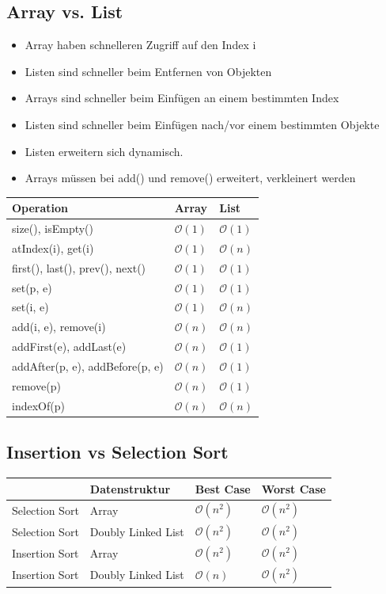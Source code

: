 \subsection{Array vs. List}
\begin{itemize}
	\item Array haben schnelleren Zugriff auf den Index i
	\item Listen sind schneller beim Entfernen von Objekten
	\item Arrays sind schneller beim Einfügen an einem bestimmten Index
	\item Listen sind schneller beim Einfügen nach/vor einem bestimmten Objekte
	\item Listen erweitern sich dynamisch. 
	\item Arrays müssen bei add() und remove() erweitert, verkleinert werden
\end{itemize}
\begin{tabu} to \linewidth {|X|X|X|}
	\hline
	Operation & Array & List \\
	\hline \hline
	size(), isEmpty() 	& $\mathcal{O}(1)$ & $\mathcal{O}(1)$ \\ 
	\hline
	atIndex(i), get(i) 	& $\mathcal{O}(1)$ & $\mathcal{O}(n)$ \\
	\hline
	first(), last(), prev(), next() 	& $\mathcal{O}(1)$ & $\mathcal{O}(1)$ \\ 
	\hline
	set(p, e) 	& $\mathcal{O}(1)$ & $\mathcal{O}(1)$ \\
	\hline
	set(i, e) 	& $\mathcal{O}(1)$ & $\mathcal{O}(n)$ \\
	\hline
	add(i, e), remove(i) 	& $\mathcal{O}(n)$ & $\mathcal{O}(n)$ \\
	\hline
	addFirst(e), addLast(e) 	& $\mathcal{O}(n)$ & $\mathcal{O}(1)$ \\
	\hline
	addAfter(p, e), addBefore(p, e) 	& $\mathcal{O}(n)$ & $\mathcal{O}(1)$ \\
	\hline
	remove(p)	& $\mathcal{O}(n)$ & $\mathcal{O}(1)$ \\
	\hline
	indexOf(p) & $\mathcal{O}(n)$ & $\mathcal{O}(n)$ \\
	\hline
\end{tabu}

\subsection{Insertion vs Selection Sort}
\begin{tabu} to \linewidth {|X|X|X|X|}
	\hline
	& Datenstruktur & Best Case & Worst Case \\
	\hline \hline
	Selection Sort & Array & $\mathcal{O}(n^2)$ & $\mathcal{O}(n^2)$ \\ \hline
	Selection Sort & Doubly Linked List & $\mathcal{O}(n^2)$ & $\mathcal{O}(n^2)$ \\ \hline
	Insertion Sort & Array & $\mathcal{O}(n^2)$ & $\mathcal{O}(n^2)$ \\ \hline
	Insertion Sort & Doubly Linked List & $\mathcal{O}(n)$ & $\mathcal{O}(n^2)$ \\ \hline
	\hline
\end{tabu}



